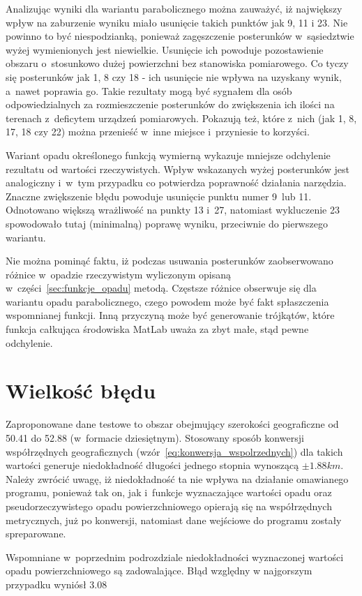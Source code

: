 Analizując wyniki dla wariantu parabolicznego można zauważyć, iż największy wpływ na zaburzenie wyniku miało usunięcie takich punktów jak 9, 11 i 23. Nie powinno to być niespodzianką, ponieważ zagęszczenie posterunków w~sąsiedztwie wyżej wymienionych jest niewielkie. Usunięcie ich powoduje pozostawienie obszaru o~stosunkowo dużej powierzchni bez stanowiska pomiarowego. Co tyczy się posterunków jak 1, 8 czy 18 - ich usunięcie nie wpływa na uzyskany wynik, a~nawet poprawia go. Takie rezultaty mogą być sygnałem dla osób odpowiedzialnych za rozmieszczenie posterunków do zwiększenia ich ilości na terenach z~deficytem urządzeń pomiarowych. Pokazują też, które z~nich (jak 1, 8, 17, 18 czy 22) można przenieść w~inne miejsce i~przyniesie to korzyści.


Wariant opadu określonego funkcją wymierną wykazuje mniejsze odchylenie rezultatu od wartości rzeczywistych. Wpływ wskazanych wyżej posterunków jest analogiczny i~w~tym przypadku co potwierdza poprawność działania narzędzia. Znaczne zwiększenie błędu powoduje usunięcie punktu numer 9~lub 11. Odnotowano większą wrażliwość na punkty 13 i~27, natomiast wykluczenie 23 spowodowało tutaj (minimalną) poprawę wyniku, przeciwnie do pierwszego wariantu.

Nie można pominąć faktu, iż podczas usuwania posterunków zaobserwowano różnice w~opadzie rzeczywistym wyliczonym opisaną w~części~\ref{sec:funkcje_opadu} metodą. Częstsze różnice obserwuje się dla wariantu opadu parabolicznego, czego powodem może być fakt spłaszczenia wspomnianej funkcji. Inną przyczyną może być generowanie trójkątów, które funkcja całkująca środowiska MatLab uważa za zbyt małe, stąd pewne odchylenie.

\section{Wielkość błędu}
Zaproponowane dane testowe to obszar obejmujący szerokości geograficzne od 50.41 do 52.88 (w~formacie dziesiętnym). Stosowany sposób konwersji współrzędnych geograficznych (wzór~\ref{eq:konwersja_wspolrzednych}) dla takich wartości generuje niedokładność długości jednego stopnia wynoszącą $\pm 1.88 km$. Należy zwrócić uwagę, iż niedokładność ta nie wpływa na działanie omawianego programu, ponieważ tak on, jak i~funkcje wyznaczające wartości opadu oraz pseudorzeczywistego opadu powierzchniowego opierają się na współrzędnych metrycznych, już po konwersji, natomiast dane wejściowe do programu zostały spreparowane.  

Wspomniane w~poprzednim podrozdziale niedokładności wyznaczonej wartości opadu powierzchniowego są zadowalające. Błąd względny w najgorszym przypadku wyniósł 3.08%